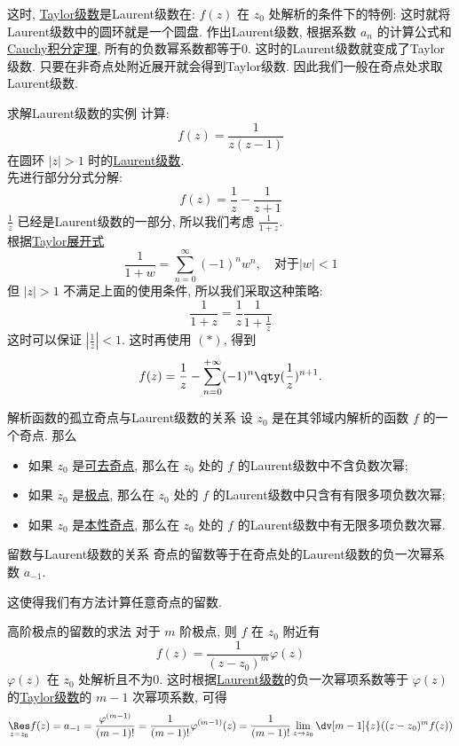 \documentclass[UTF8]{ctexart}
\newcommand{\CauchyThm}{\hyperref[thm:Cauchy]{Cauchy积分定理}}
\begin{document}
这时, \hyperref[thm:TaylorSeries]{Taylor级数}是Laurent级数在:  \( f(z) \) 在 \( z_0 \) 处解析的条件下的特例: 这时就将Laurent级数中的圆环就是一个圆盘. 作出Laurent级数, 根据系数 \( a_n \) 的计算公式和\CauchyThm, 所有的负数幂系数都等于0. 这时的Laurent级数就变成了Taylor级数. 只要在非奇点处附近展开就会得到Taylor级数. 因此我们一般在奇点处求取Laurent级数. 
\begin{xmp}
    {求解Laurent级数的实例}
    计算: 
    \[f(z)=\frac{1}{z(z-1)}\]
    在圆环 \( |z|>1 \) 时的\hyperref[thm:Laurent]{Laurent级数}.\\
    先进行部分分式分解: 
    \[f(z)=\frac{1}{z}-\frac{1}{z+1}\]
    \( \frac{1}{z} \) 已经是Laurent级数的一部分, 所以我们考虑 \( \frac{1}{1+z} \).\\
    根据\hyperref[xmp:TaylorCommon]{Taylor展开式}
    \[\frac{1}{1 + w} = \sum_{n=0}^{\infty} (-1)^n w^n, \quad \text{对于} |w| < 1\tag{ \( \ast \) }\]
    但 \( |z|>1 \) 不满足上面的使用条件, 所以我们采取这种策略: 
    \[\frac{1}{1+z}=\frac{1}{z}\frac{1}{1+\frac{1}{z}}\]
    这时可以保证 \( \left\lvert \frac{1}{z}\right\rvert <1 \). 这时再使用 \( (\ast) \), 得到
    \[f(z)=\frac{1}{z}-\sum_{n=0}^{+\infty}(-1)^n\qty(\frac{1}{z})^{n+1}.\]
\end{xmp}
\begin{thm}
    {解析函数的孤立奇点与Laurent级数的关系}
    设 \( z_0 \) 是在其邻域内解析的函数 \( f \) 的一个奇点. 那么
    \begin{itemize}
        \item 如果 \( z_0 \) 是\hyperref[dfn:RemovableSingularity]{可去奇点}, 那么在 \( z_0 \) 处的 \( f \) 的Laurent级数中不含负数次幂; 
        \item 如果 \( z_0 \) 是\hyperref[dfn:PolarSingularity]{极点}, 那么在 \( z_0 \) 处的 \( f \) 的Laurent级数中只含有有限多项负数次幂; 
        \item 如果 \( z_0 \) 是\hyperref[dfn:EssentialSingularity]{本性奇点}, 那么在 \( z_0 \) 处的 \( f \) 的Laurent级数中有无限多项负数次幂. 
    \end{itemize}
\end{thm}
\begin{crl}
    {留数与Laurent级数的关系}
    奇点的留数等于在奇点处的Laurent级数的负一次幂系数 \( a_{-1} \).
\end{crl}
这使得我们有方法计算任意奇点的留数. 
\begin{crl}
    {高阶极点的留数的求法}
    对于 \( m \) 阶极点, 则 \( f \) 在 \( z_0 \) 附近有
    \[f(z)=\frac{1}{(z-z_0)^m}\varphi(z)\]
     \( \varphi(z) \) 在 \( z_0 \) 处解析且不为0. 这时根据\hyperref[thm:Laurent]{Laurent级数}的负一次幂项系数等于 \( \varphi(z) \) 的\hyperref[thm:TaylorSeries]{Taylor级数}的 \( m-1 \) 次幂项系数, 可得
    \[\underset{z=z_0}{\Res}f(z)=a_{-1}=\frac{\varphi^{(m-1)}}{(m-1)!}=\frac{1}{(m-1)!}\varphi^{(m-1)}(z)=\frac{1}{(m-1)!}\lim_{z\to z_0}\dv[m-1]{z}((z-z_0)^mf(z))\]
\end{crl}
\end{document}
